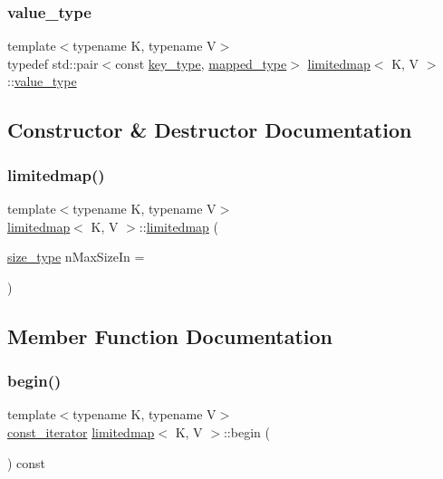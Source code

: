 \subsubsection{\texorpdfstring{value\+\_\+type}{value\_type}}
{\footnotesize\ttfamily template$<$typename K, typename V$>$ \\
typedef std\+::pair$<$const \mbox{\hyperlink{classlimitedmap_aebf71255c65df699225cdcefe88717b9}{key\+\_\+type}}, \mbox{\hyperlink{classlimitedmap_a8bd6b8e7f91f0a141c91c382b492c03c}{mapped\+\_\+type}}$>$ \mbox{\hyperlink{classlimitedmap}{limitedmap}}$<$ K, V $>$\+::\mbox{\hyperlink{classlimitedmap_a8a6c4972e628b71bf43eeb757dafdce5}{value\+\_\+type}}}



\subsection{Constructor \& Destructor Documentation}
\mbox{\label{classlimitedmap_a6670d7a262af3551de75658123b7cb60}} 
\subsubsection{\texorpdfstring{limitedmap()}{limitedmap()}}
{\footnotesize\ttfamily template$<$typename K, typename V$>$ \\
\mbox{\hyperlink{classlimitedmap}{limitedmap}}$<$ K, V $>$\+::\mbox{\hyperlink{classlimitedmap}{limitedmap}} (\begin{DoxyParamCaption}\item[{\mbox{\hyperlink{classlimitedmap_a1c564b323f94e182e56aa27975e5f9d1}{size\+\_\+type}}}]{n\+Max\+Size\+In = {} }\end{DoxyParamCaption})\hspace{0.3cm}{\ttfamily [inline]}}



\subsection{Member Function Documentation}
\mbox{\label{classlimitedmap_a00fae18eb84547065de8beeaa3ca8fe1}} 
\subsubsection{\texorpdfstring{begin()}{begin()}}
{\footnotesize\ttfamily template$<$typename K, typename V$>$ \\
\mbox{\hyperlink{classlimitedmap_ab0a3e4f2ec7c82359300c83a35ae2500}{const\+\_\+iterator}} \mbox{\hyperlink{classlimitedmap}{limitedmap}}$<$ K, V $>$\+::begin (\begin{DoxyParamCaption}{ }\end{DoxyParamCaption}) const\hspace{0.3cm}{\ttfamily [inline]}}

